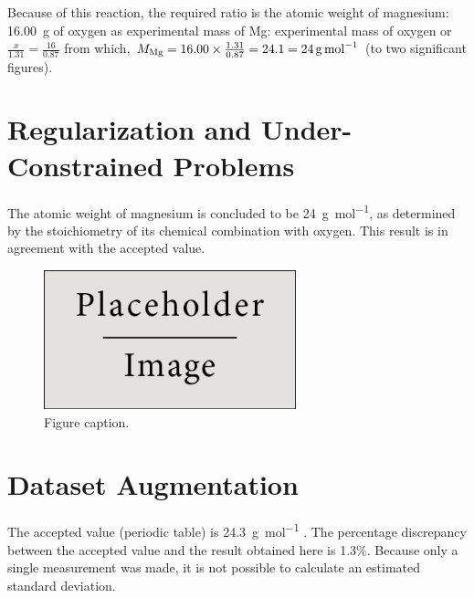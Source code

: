 \documentclass{article}
\begin{document}
Because of this reaction, the required ratio is the atomic weight of magnesium: \SI{16.00}{\gram} of oxygen as experimental mass of Mg: experimental mass of oxygen or $\frac{x}{1.31}=\frac{16}{0.87}$ from which, $M_{\ce{Mg}} = 16.00 \times \frac{1.31}{0.87} = 24.1 = \SI{24}{\gram\per\mole}$ (to two significant figures).


\section{Regularization and Under-Constrained Problems}

The atomic weight of magnesium is concluded to be \SI{24}{\gram\per\mol}, as determined by the stoichiometry of its chemical combination with oxygen. This result is in agreement with the accepted value.

\begin{figure}[h]
\begin{center}
\includegraphics[width=0.65\textwidth]{placeholder} %
\caption{Figure caption.}
\end{center}
\end{figure}


\section{Dataset Augmentation}

The accepted value (periodic table) is \SI{24.3}{\gram\per\mole} \cite{Smith:2012qr}. The percentage discrepancy between the accepted value and the result obtained here is 1.3\%. Because only a single measurement was made, it is not possible to calculate an estimated standard deviation.
\end{document}
